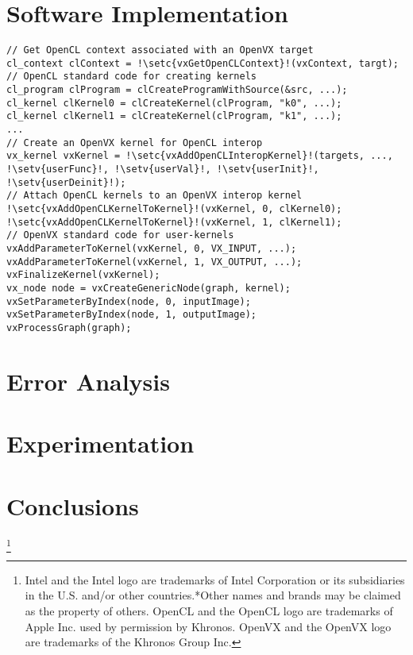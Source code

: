 \documentclass[sigconf]{acmart}
\makeatletter
\newcommand\BeraMonottfamily{%
	\def\fvm@Scale{0.75}
	\fontfamily{fvm}\selectfont
}
\newcommand\setc[1]{\hspace{-1ex}\textcolor{blue}{\bf\BeraMonottfamily{#1}}}
\newcommand\setv[1]{\hspace{-1ex}\textcolor{bostonuniversityred}{\bf\BeraMonottfamily{#1}}}
\makeatother
\begin{document}
\section{Software Implementation}
\begin{lstlisting}[caption={OpenCL Interop-kernel},label={OpenCLInteropKernel}]
// Get OpenCL context associated with an OpenVX target
cl_context clContext = !\setc{vxGetOpenCLContext}!(vxContext, targt);
// OpenCL standard code for creating kernels
cl_program clProgram = clCreateProgramWithSource(&src, ...);
cl_kernel clKernel0 = clCreateKernel(clProgram, "k0", ...);
cl_kernel clKernel1 = clCreateKernel(clProgram, "k1", ...);
...
// Create an OpenVX kernel for OpenCL interop
vx_kernel vxKernel = !\setc{vxAddOpenCLInteropKernel}!(targets, ...,
!\setv{userFunc}!, !\setv{userVal}!, !\setv{userInit}!, !\setv{userDeinit}!);
// Attach OpenCL kernels to an OpenVX interop kernel
!\setc{vxAddOpenCLKernelToKernel}!(vxKernel, 0, clKernel0);
!\setc{vxAddOpenCLKernelToKernel}!(vxKernel, 1, clKernel1);
// OpenVX standard code for user-kernels
vxAddParameterToKernel(vxKernel, 0, VX_INPUT, ...);
vxAddParameterToKernel(vxKernel, 1, VX_OUTPUT, ...);
vxFinalizeKernel(vxKernel);
vx_node node = vxCreateGenericNode(graph, kernel);
vxSetParameterByIndex(node, 0, inputImage);
vxSetParameterByIndex(node, 1, outputImage);
vxProcessGraph(graph);
\end{lstlisting}
\section{Error Analysis}
\section{Experimentation}
\section{Conclusions}

\let\thefootnote\relax\footnote{Intel and the Intel logo are trademarks of Intel Corporation or its subsidiaries in the U.S. and/or other countries.*Other names and brands may be claimed as the property of others. OpenCL and the OpenCL logo are trademarks of Apple Inc. used by permission by Khronos. OpenVX and the OpenVX logo are trademarks of the Khronos Group Inc.}  
	

 
\end{document}

